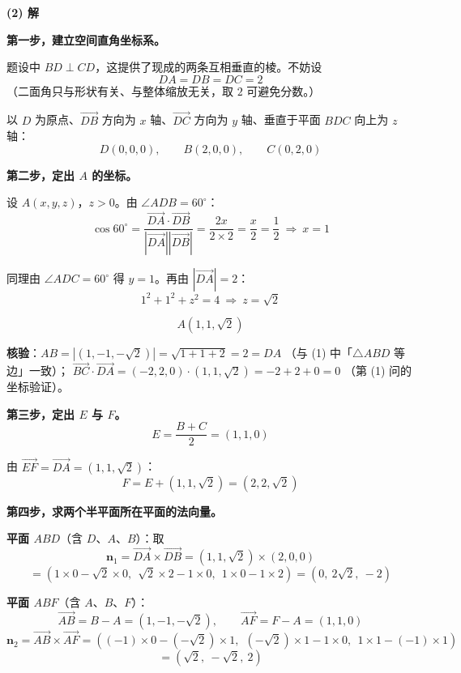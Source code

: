 \begin{answer}
\par\medskip

\textbf{(2) 解}

\textbf{第一步，建立空间直角坐标系。}

题设中 $BD\perp CD$，这提供了现成的两条互相垂直的棱。不妨设
\nopagebreak[4]
\[DA=DB=DC=2\]
（二面角只与形状有关、与整体缩放无关，取 $2$ 可避免分数。）

以 $D$ 为原点、$\overrightarrow{DB}$ 方向为 $x$ 轴、$\overrightarrow{DC}$ 方向为 $y$ 轴、垂直于平面 $BDC$ 向上为 $z$ 轴：
\nopagebreak[4]
\[D(0,0,0),\qquad B(2,0,0),\qquad C(0,2,0)\]

\textbf{第二步，定出 $A$ 的坐标。}

设 $A(x,y,z)$，$z>0$。由 $\angle ADB=60^\circ$：
\nopagebreak[4]
\[\cos60^\circ=\frac{\overrightarrow{DA}\cdot\overrightarrow{DB}}{\left|\overrightarrow{DA}\right|\left|\overrightarrow{DB}\right|}=\frac{2x}{2\times2}=\frac x2=\frac12\ \Longrightarrow\ x=1\]

同理由 $\angle ADC=60^\circ$ 得 $y=1$。再由 $\left|\overrightarrow{DA}\right|=2$：
\nopagebreak[4]
\[1^{2}+1^{2}+z^{2}=4\ \Longrightarrow\ z=\sqrt2\]

\nopagebreak[4]
\[A\left(1,1,\sqrt2\right)\]

\textbf{核验}：$AB=\left|\left(1,-1,-\sqrt2\right)\right|=\sqrt{1+1+2}=2=DA$ （与 (1) 中「$\triangle ABD$ 等边」一致）；
$\overrightarrow{BC}\cdot\overrightarrow{DA}=(-2,2,0)\cdot\left(1,1,\sqrt2\right)=-2+2+0=0$ （第 (1) 问的坐标验证）。

\textbf{第三步，定出 $E$ 与 $F$。}
\nopagebreak[4]
\[E=\frac{B+C}2=(1,1,0)\]

由 $\overrightarrow{EF}=\overrightarrow{DA}=\left(1,1,\sqrt2\right)$：
\nopagebreak[4]
\[F=E+\left(1,1,\sqrt2\right)=\left(2,2,\sqrt2\right)\]

\textbf{第四步，求两个半平面所在平面的法向量。}

\textbf{平面 $ABD$}（含 $D$、$A$、$B$）：取
\nopagebreak[4]
\[\boldsymbol n_1=\overrightarrow{DA}\times\overrightarrow{DB}=\left(1,1,\sqrt2\right)\times(2,0,0)\]
\nopagebreak[4]
\[=\left(1\times0-\sqrt2\times0,\ \ \sqrt2\times2-1\times0,\ \ 1\times0-1\times2\right)=\left(0,\ 2\sqrt2,\ -2\right)\]

\textbf{平面 $ABF$}（含 $A$、$B$、$F$）：
\nopagebreak[4]
\[\overrightarrow{AB}=B-A=\left(1,-1,-\sqrt2\right),\qquad \overrightarrow{AF}=F-A=(1,1,0)\]
\nopagebreak[4]
\[\boldsymbol n_2=\overrightarrow{AB}\times\overrightarrow{AF}=\left((-1)\times0-\left(-\sqrt2\right)\times1,\ \ \left(-\sqrt2\right)\times1-1\times0,\ \ 1\times1-(-1)\times1\right)\]
\nopagebreak[4]
\[=\left(\sqrt2,\ -\sqrt2,\ 2\right)\]


\end{answer}
